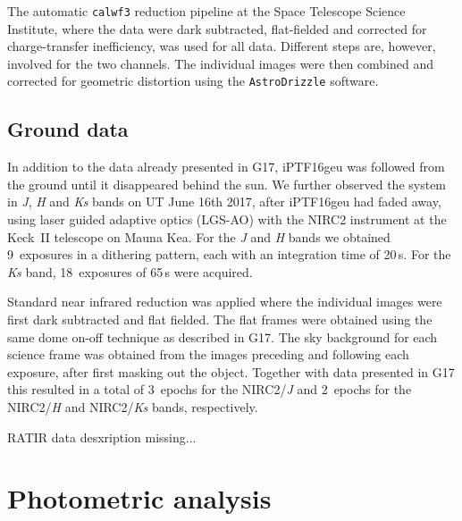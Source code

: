 \documentclass[a4paper,fleqn,usenatbib]{mnras}
\newcommand{\geu}{iPTF16geu\xspace}
\newcommand{\scipap}{G17\xspace}
\newcommand{\jband}{{\it J}\xspace}
\newcommand{\hband}{{\it H}\xspace}
\newcommand{\ksband}{{\it Ks}\xspace}
\begin{document}
The automatic \texttt{calwf3} reduction pipeline at the Space Telescope Science Institute, where the data were dark subtracted, 
flat-fielded and corrected for charge-transfer inefficiency, was used for all data. Different steps are, however, involved for the two
channels.  The individual images were then combined and corrected for geometric distortion using the \texttt{AstroDrizzle} software.

\subsection{Ground data}
In addition to the data already presented in \scipap, \geu was followed from the ground until it disappeared behind 
the sun.  We further observed the system in \jband, \hband and \ksband bands on UT June 16th 2017, after \geu had faded away, 
using laser guided adaptive optics (LGS-AO) with the NIRC2 instrument at the Keck~II telescope on Mauna Kea.  For the 
\jband and \hband bands we obtained 9~exposures in a dithering pattern, each with an integration time of 20\,s.  For the \ksband band, 
18~exposures of 65\,s were acquired. 

Standard near infrared reduction was applied where the individual images were first dark subtracted and flat fielded.  The flat 
frames were obtained using the same dome on-off technique as described in \scipap.  The sky background for each science 
frame was obtained from the images preceding and following each exposure, after first masking out the object.  
Together with data presented in \scipap this resulted in a total of 3~epochs for the NIRC2/\jband and 2~epochs for the 
NIRC2/\hband and NIRC2/\ksband bands, respectively.

RATIR data desxription missing...

\section{Photometric analysis}
\end{document}
